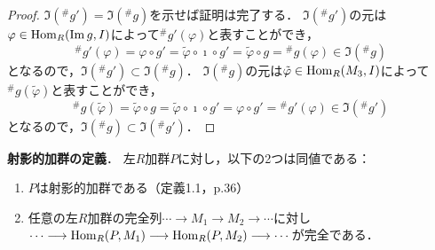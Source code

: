 \begin{proof}
  $\Im(^\# g') = \Im(^\# g)$を示せば証明は完了する．
  $\Im(^\# g')$の元は$\varphi \in \operatorname{Hom}_R(\operatorname{Im} g, I)$によって$^\# g'(\varphi)$と表すことができ，
  \[^\# g'(\varphi) = \varphi \circ g' = \tilde{\varphi} \circ \imath \circ g' = \tilde\varphi \circ g ={} ^\# g (\varphi) \in \Im(^\# g)\]
  となるので，$\Im(^\# g') \subset \Im(^\# g)$．
  $\Im(^\# g)$の元は$\tilde\varphi \in \operatorname{Hom}_R(M_3, I)$によって$^\# g(\tilde\varphi)$と表すことができ，
  \[^\# g(\tilde\varphi) = \tilde\varphi \circ g = \tilde{\varphi} \circ \imath \circ g' = \varphi \circ g' ={} ^\# g' (\varphi) \in \Im(^\# g')\]
  となるので，$\Im(^\# g) \subset \Im(^\# g')$．
\end{proof}

\begin{screen}
  \textbf{射影的加群の定義}．
  左$R$加群$P$に対し，以下の2つは同値である：
  \begin{enumerate}[label=(\roman*)]
    \item $P$は射影的加群である（定義1.1，p.36）
    \item 任意の左$R$加群の完全列$ \cdots \longrightarrow M_1 \longrightarrow M_2 \longrightarrow \cdots$に対し$ \cdots \longrightarrow \operatorname{Hom}_R(P, M_1) \longrightarrow \operatorname{Hom}_R(P, M_2) \longrightarrow \cdots$が完全である．
  \end{enumerate}
\end{screen}

